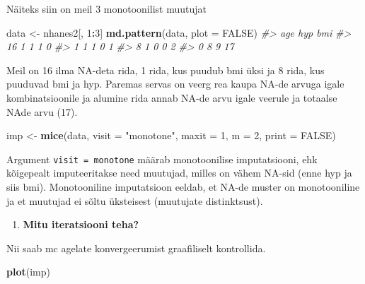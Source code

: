 \documentclass[]{book}
\newenvironment{Shaded}{\begin{snugshade}}{\end{snugshade}}
\newcommand{\CommentTok}[1]{\textcolor[rgb]{0.56,0.35,0.01}{\textit{#1}}}
\newcommand{\DataTypeTok}[1]{\textcolor[rgb]{0.13,0.29,0.53}{#1}}
\newcommand{\DecValTok}[1]{\textcolor[rgb]{0.00,0.00,0.81}{#1}}
\newcommand{\KeywordTok}[1]{\textcolor[rgb]{0.13,0.29,0.53}{\textbf{#1}}}
\newcommand{\NormalTok}[1]{#1}
\newcommand{\OperatorTok}[1]{\textcolor[rgb]{0.81,0.36,0.00}{\textbf{#1}}}
\newcommand{\OtherTok}[1]{\textcolor[rgb]{0.56,0.35,0.01}{#1}}
\newcommand{\StringTok}[1]{\textcolor[rgb]{0.31,0.60,0.02}{#1}}
\providecommand{\tightlist}{%
  \setlength{\itemsep}{0pt}\setlength{\parskip}{0pt}}
\begin{document}
Näiteks siin on meil 3 monotoonilist muutujat

\begin{Shaded}
\begin{Highlighting}[]
\NormalTok{data <-}\StringTok{ }\NormalTok{nhanes2[, }\DecValTok{1}\OperatorTok{:}\DecValTok{3}\NormalTok{]}
\KeywordTok{md.pattern}\NormalTok{(data, }\DataTypeTok{plot =} \OtherTok{FALSE}\NormalTok{)}
\CommentTok{#>    age hyp bmi   }
\CommentTok{#> 16   1   1   1  0}
\CommentTok{#> 1    1   1   0  1}
\CommentTok{#> 8    1   0   0  2}
\CommentTok{#>      0   8   9 17}
\end{Highlighting}
\end{Shaded}

Meil on 16 ilma NA-deta rida, 1 rida, kus puudub bmi üksi ja 8 rida, kus puuduvad bmi ja hyp. Paremas servas on veerg rea kaupa NA-de arvuga igale kombinatsioonile ja alumine rida annab NA-de arvu igale veerule ja totaalse NAde arvu (17).

\begin{Shaded}
\begin{Highlighting}[]
\NormalTok{imp <-}\StringTok{ }\KeywordTok{mice}\NormalTok{(data, }\DataTypeTok{visit =} \StringTok{"monotone"}\NormalTok{, }\DataTypeTok{maxit =} \DecValTok{1}\NormalTok{, }\DataTypeTok{m =} \DecValTok{2}\NormalTok{,}
            \DataTypeTok{print =} \OtherTok{FALSE}\NormalTok{)}
\end{Highlighting}
\end{Shaded}

Argument \texttt{visit\ =\ monotone} määrab monotoonilise imputatsiooni, ehk kõigepealt imputeeritakse need muutujad, milles on vähem NA-sid (enne hyp ja siis bmi). Monotooniline imputatsioon eeldab, et NA-de muster on monotooniline ja et muutujad ei sõltu üksteisest (muutujate distinktsust).

\begin{enumerate}
\def\labelenumi{\arabic{enumi}.}
\setcounter{enumi}{5}
\tightlist
\item
  \textbf{Mitu iteratsiooni teha?}
\end{enumerate}

Nii saab mc agelate konvergeerumist graafiliselt kontrollida.

\begin{Shaded}
\begin{Highlighting}[]
\KeywordTok{plot}\NormalTok{(imp)}
\end{Highlighting}
\end{Shaded}
\end{document}
